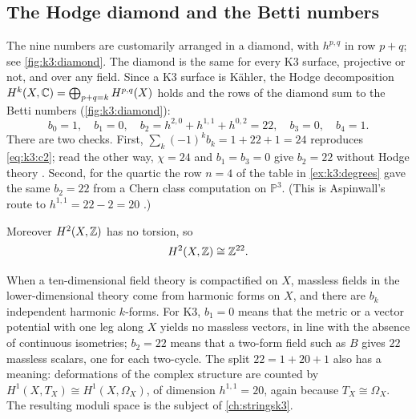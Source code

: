 \subsection{The Hodge diamond and the Betti numbers}

The nine numbers are customarily arranged in a diamond, with $h^{p,q}$
in row $p+q$; see \cref{fig:k3:diamond}.
 The diamond is
the same for every K3 surface, projective or not, and over any field. Since a K3 surface is
Kähler, the Hodge decomposition $H^k(X,\mathbb{C})=\bigoplus_{p+q=k}H^{p,q}(X)$ holds and the rows of
the diamond sum to the Betti numbers (\cref{fig:k3:diamond}):
\begin{equation}\label{eq:k3:betti}
  b_0=1,\quad b_1=0,\quad b_2=h^{2,0}+h^{1,1}+h^{0,2}=22,\quad b_3=0,\quad b_4=1 .
\end{equation}
There are two checks. First, $\sum_k(-1)^kb_k=1+22+1=24$ reproduces \eqref{eq:k3:c2}; read
the other way, $\chi=24$ and $b_1=b_3=0$ give $b_2=22$ without Hodge theory
. Second, for the quartic the row $n=4$ of the table in
\cref{ex:k3:degrees} gave the same $b_2=22$ from a Chern class computation on $\mathbb{P}^3$.
(This is Aspinwall's route to $h^{1,1}=22-2=20$ .)

Moreover $H^2(X,\mathbb{Z})$ has no torsion, so
\begin{equation}
  H^2(X,\mathbb{Z})\cong\mathbb{Z}^{22}.
\end{equation}
 \TL{}

\begin{physicsbox}
When a ten-dimensional field theory is compactified on $X$, massless fields in the
lower-dimensional theory come from harmonic forms on $X$, and there are $b_k$ independent
harmonic $k$-forms. For K3, $b_1=0$ means that the metric or a vector potential with one leg
along $X$ yields no massless vectors, in line with the absence of continuous isometries;
$b_2=22$ means that a two-form field such as $B$ gives $22$ massless scalars, one for each
two-cycle. The split $22=1+20+1$ also has a meaning: deformations of the complex structure are
counted by $H^1(X,T_X)\cong H^1(X,\Omega_X)$, of dimension $h^{1,1}=20$, again because
$T_X\cong\Omega_X$. The resulting moduli space is the subject of \cref{ch:stringsk3}.
\end{physicsbox}

